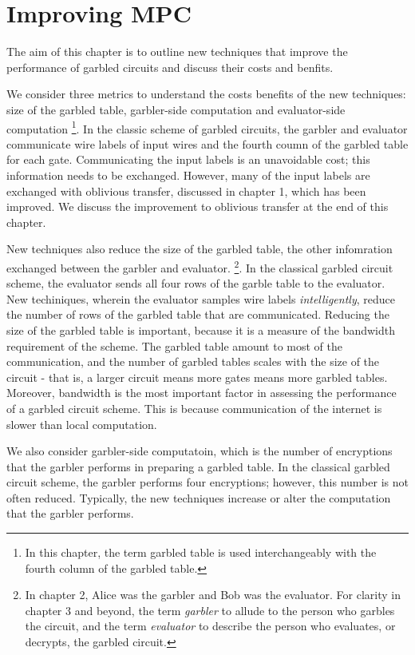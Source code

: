 \chapter{Improving MPC}

The aim of this chapter is to outline new techniques that improve the performance of garbled circuits and discuss their costs and benfits.

We consider three metrics to understand the costs benefits of the new techniques: size of the garbled table, garbler-side computation and evaluator-side computation
\footnote{In this chapter, the term garbled table is used interchangeably with the fourth column of the garbled table.}.
In the classic scheme of garbled circuits, the garbler and evaluator communicate wire labels of input wires and the fourth coumn of the garbled table for each gate.
Communicating the input labels is an unavoidable cost; this information needs to be exchanged. 
However, many of the input labels are exchanged with oblivious transfer, discussed in chapter 1, which has been improved.
We discuss the improvement to oblivious transfer at the end of this chapter.

New techniques also reduce the size of the garbled table, the other infomration exchanged between the garbler and evaluator.
\footnote{In chapter 2, Alice was the garbler and Bob was the evaluator. For clarity in chapter 3 and beyond, the term \textit{garbler} to allude to the person who garbles the circuit, and the term \textit{evaluator} to describe the person who evaluates, or decrypts, the garbled circuit.}.
In the classical garbled circuit scheme, the evaluator sends all four rows of the garble table to the evaluator.
New techiniques, wherein the evaluator samples wire labels \textit{intelligently}, reduce the number of rows of the garbled table that are communicated.
Reducing the size of the garbled table is important, because it is a measure of the bandwidth requirement of the scheme.
The garbled table amount to most of the communication, and the number of garbled tables scales with the size of the circuit - that is, a larger circuit means more gates means more garbled tables.
Moreover, bandwidth is the most important factor in assessing the performance of a garbled circuit scheme.
This is because communication of the internet is slower than local computation.

We also consider garbler-side computatoin, which is the number of encryptions that the garbler performs in preparing a garbled table.
In the classical garbled circuit scheme, the garbler performs four encryptions; however, this number is not often reduced.
Typically, the new techniques increase or alter the computation that the garbler performs.

